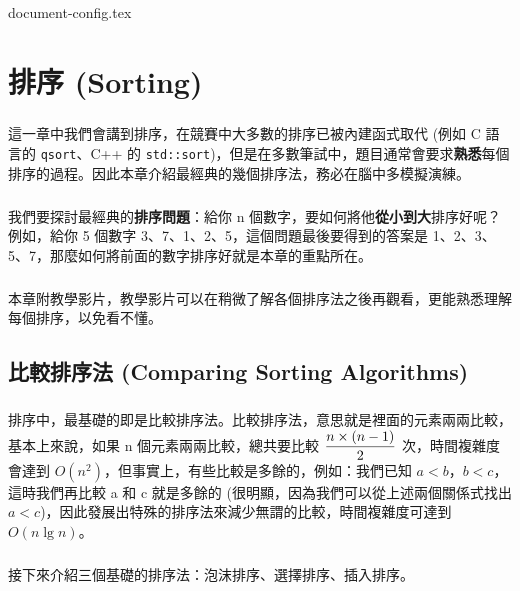\documentclass[12pt,a4paper,oneside]{report}
\begin{document}
\begin{CJK}{UTF8}{bkai}

{document-config.tex}

\fi

\chapter{排序 (Sorting)}

\paragraph{}這一章中我們會講到排序，在競賽中大多數的排序已被內建函式取代 (例如 C 語言的 \lstinline{qsort}{}、C++ 的 \lstinline{std::sort}{})，但是在多數筆試中，題目通常會要求\textbf{熟悉}每個排序的過程。因此本章介紹最經典的幾個排序法，務必在腦中多模擬演練。

\paragraph{}我們要探討最經典的\textbf{排序問題}：給你 n 個數字，要如何將他\textbf{從小到大}排序好呢？例如，給你 5 個數字 3、7、1、2、5，這個問題最後要得到的答案是 1、2、3、5、7，那麼如何將前面的數字排序好就是本章的重點所在。

\paragraph{}本章附教學影片，教學影片可以在稍微了解各個排序法之後再觀看，更能熟悉理解每個排序，以免看不懂。

\section{比較排序法 (Comparing Sorting Algorithms)}

\paragraph{}排序中，最基礎的即是比較排序法。比較排序法，意思就是裡面的元素兩兩比較，基本上來說，如果 n 個元素兩兩比較，總共要比較 $\displaystyle{{n\times{(n - 1)}}\over{2}}$ 次，時間複雜度會達到 $O(n^2)$，但事實上，有些比較是多餘的，例如：我們已知 $a<b$，$b<c$，這時我們再比較 a 和 c 就是多餘的 (很明顯，因為我們可以從上述兩個關係式找出 $a<c$)，因此發展出特殊的排序法來減少無謂的比較，時間複雜度可達到 $O(n\lg{n})$。

\paragraph{}接下來介紹三個基礎的排序法：泡沫排序、選擇排序、插入排序。


\end{CJK}
\end{document}
